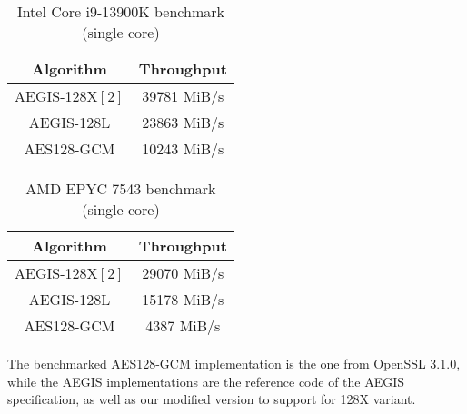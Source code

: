 \documentclass[envcountsame,runningheads,notitlepage]{llncs}
\begin{document}
\begin{table}
  \begin{center}
    \begin{tabular}{|c|c|}
      \hline
      Algorithm       & Throughput  \\
      \hline
      AEGIS-128X$[2]$ & 39781 MiB/s \\
      \hline
      AEGIS-128L      & 23863 MiB/s \\
      \hline
      AES128-GCM      & 10243 MiB/s \\
      \hline
    \end{tabular}
    \caption{\label{i9-13900K}Intel Core i9-13900K benchmark (single core)}
  \end{center}
\end{table}

\begin{table}
  \begin{center}
    \begin{tabular}{|c|c|}
      \hline
      Algorithm       & Throughput  \\
      \hline
      AEGIS-128X$[2]$ & 29070 MiB/s \\
      \hline
      AEGIS-128L      & 15178 MiB/s \\
      \hline
      AES128-GCM      & 4387 MiB/s  \\
      \hline
    \end{tabular}
\caption{\label{epyc-7543}AMD EPYC 7543 benchmark (single core)}
  \end{center}
\end{table}

The benchmarked AES128-GCM implementation is the one from OpenSSL 3.1.0, while the AEGIS implementations are the reference code of the AEGIS specification, as well as our modified version to support for 128X variant.

\ifnum{}
  
\else
  
\fi

\end{document}
